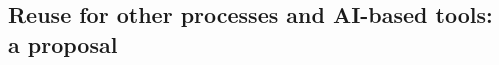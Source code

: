 \documentclass[pdflatex,sn-basic,lineno]{sn-jnl}
\newcommand{\tabsize}{\fontsize{8}{9.5}\selectfont}
\providecommand{\DIFaddbegin}{} %
\providecommand{\DIFaddend}{} %
\providecommand{\DIFdelbegin}{} %
\providecommand{\DIFdelend}{} %
\newcommand{\DIFscaledelfig}{0.5}
\newlength{\DIFdelgraphicswidth} %
\newlength{\DIFdelgraphicsheight} %
\newcommand{\DIFaddincludegraphics}[2][]{{\color{blue}\fbox{\DIFOincludegraphics[#1]{#2}}}} %
\newcommand{\DIFdelincludegraphics}[2][]{%
\sbox{\DIFdelgraphicsbox}{\DIFOincludegraphics[#1]{#2}}%
\settoboxwidth{\DIFdelgraphicswidth}{\DIFdelgraphicsbox} %
\settoboxtotalheight{\DIFdelgraphicsheight}{\DIFdelgraphicsbox} %
\scalebox{\DIFscaledelfig}{%
\parbox[b]{\DIFdelgraphicswidth}{\usebox{\DIFdelgraphicsbox}\\[-\baselineskip] \rule{\DIFdelgraphicswidth}{0em}}\llap{\resizebox{\DIFdelgraphicswidth}{\DIFdelgraphicsheight}{%
\setlength{\unitlength}{\DIFdelgraphicswidth}%
\begin{picture}(1,1)%
\thicklines\linethickness{2pt} %
{\color[rgb]{1,0,0}\put(0,0){\framebox(1,1){}}}%
{\color[rgb]{1,0,0}\put(0,0){\line( 1,1){1}}}%
{\color[rgb]{1,0,0}\put(0,1){\line(1,-1){1}}}%
\end{picture}%
}\hspace*{3pt}}} %
} %
\DeclareRobustCommand{\DIFaddbegin}{\DIFOaddbegin \let\includegraphics\DIFaddincludegraphics} %
\DeclareRobustCommand{\DIFaddend}{\DIFOaddend \let\includegraphics\DIFOincludegraphics} %
\DeclareRobustCommand{\DIFdelbegin}{\DIFOdelbegin \let\includegraphics\DIFdelincludegraphics} %
\DeclareRobustCommand{\DIFdelend}{\DIFOaddend \let\includegraphics\DIFOincludegraphics} %
\begin{document}
\DIFdelbegin %

\DIFdelend \DIFaddbegin \subsection{Reuse for other processes and AI-based tools: a proposal}\DIFaddend \label{sec:reuse}
\end{document}
